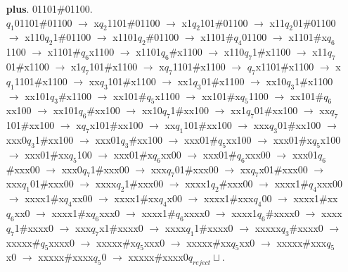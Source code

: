 \documentclass[12pt]{letter}
\begin{document}
\begin{enumerate}
\begin{enumerate}
	\item[\textbf{plus}.] 01101\#01100. \\
	$q_1$01101\#01100 $\rightarrow$ x$q_2$1101\#01100 $\rightarrow$ x1$q_2$101\#01100 $\rightarrow$ x11$q_2$01\#01100 $\rightarrow$ x110$q_2$1\#01100 $\rightarrow$ x1101$q_2$\#01100 $\rightarrow$ x1101\#$q_4$01100 $\rightarrow$ x1101\#x$q_6$1100 $\rightarrow$ x1101\#$q_6$x1100 $\rightarrow$ x1101$q_6$\#x1100 $\rightarrow$ x110$q_7$1\#x1100 $\rightarrow$ x11$q_7$01\#x1100 $\rightarrow$ x1$q_7$101\#x1100 $\rightarrow$ x$q_7$1101\#x1100 $\rightarrow$ $q_7$x1101\#x1100 $\rightarrow$ x$q_1$1101\#x1100 $\rightarrow$ xx$q_3$101\#x1100 $\rightarrow$ xx1$q_3$01\#x1100 $\rightarrow$ xx10$q_3$1\#x1100 $\rightarrow$ xx101$q_3$\#x1100 $\rightarrow$ xx101\#$q_5$x1100 $\rightarrow$ xx101\#x$q_5$1100 $\rightarrow$ xx101\#$q_6$xx100 $\rightarrow$ xx101$q_6$\#xx100 $\rightarrow$ xx10$q_7$1\#xx100 $\rightarrow$ xx1$q_7$01\#xx100 $\rightarrow$ xx$q_7$101\#xx100 $\rightarrow$ x$q_7$x101\#xx100 $\rightarrow$ xx$q_1$101\#xx100 $\rightarrow$ xxx$q_3$01\#xx100 $\rightarrow$ xxx0$q_3$1\#xx100 $\rightarrow$ xxx01$q_3$\#xx100 $\rightarrow$ xxx01\#$q_5$xx100 $\rightarrow$ xxx01\#x$q_5$x100 $\rightarrow$ xxx01\#xx$q_5$100 $\rightarrow$ xxx01\#x$q_6$xx00 $\rightarrow$ xxx01\#$q_6$xxx00 $\rightarrow$ xxx01$q_6$\#xxx00 $\rightarrow$ xxx0$q_7$1\#xxx00 $\rightarrow$ xxx$q_7$01\#xxx00 $\rightarrow$ xx$q_7$x01\#xxx00 $\rightarrow$ xxx$q_1$01\#xxx00 $\rightarrow$ xxxx$q_2$1\#xxx00 $\rightarrow$ xxxx1$q_2$\#xxx00 $\rightarrow$ xxxx1\#$q_4$xxx00 $\rightarrow$ xxxx1\#x$q_4$xx00 $\rightarrow$ xxxx1\#xx$q_4$x00 $\rightarrow$ xxxx1\#xxx$q_4$00 $\rightarrow$ xxxx1\#xx$q_6$xx0 $\rightarrow$ xxxx1\#x$q_6$xxx0 $\rightarrow$ xxxx1\#$q_6$xxxx0 $\rightarrow$ xxxx1$q_6$\#xxxx0 $\rightarrow$ xxxx$q_7$1\#xxxx0 $\rightarrow$ xxx$q_7$x1\#xxxx0 $\rightarrow$ xxxx$q_1$1\#xxxx0 $\rightarrow$ xxxxx$q_3$\#xxxx0 $\rightarrow$ xxxxx\#$q_5$xxxx0 $\rightarrow$ xxxxx\#x$q_5$xxx0 $\rightarrow$ xxxxx\#xx$q_5$xx0 $\rightarrow$ xxxxx\#xxx$q_5$x0 $\rightarrow$ xxxxx\#xxxx$q_5$0 $\rightarrow$ xxxxx\#xxxx0$q_{reject}\sqcup.$ 
\end{enumerate}


\end{enumerate}
\end{document}
